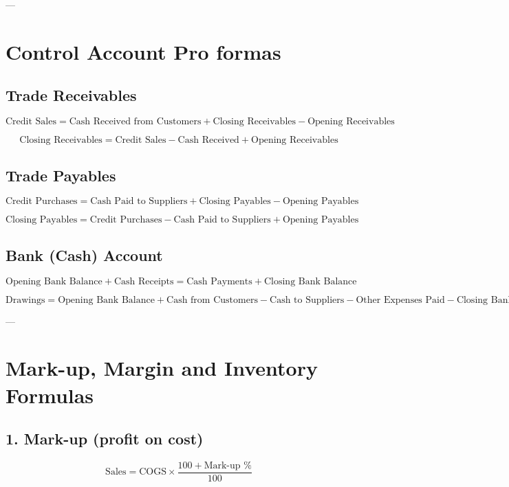 ---

\section{Control Account Pro formas}

\subsection{Trade Receivables}

\[
\text{Credit Sales} = \text{Cash Received from Customers} + \text{Closing Receivables} - \text{Opening Receivables}
\]

\[
\text{Closing Receivables} = \text{Credit Sales} - \text{Cash Received} + \text{Opening Receivables}
\]

\subsection{Trade Payables}

\[
\text{Credit Purchases} = \text{Cash Paid to Suppliers} + \text{Closing Payables} - \text{Opening Payables}
\]

\[
\text{Closing Payables} = \text{Credit Purchases} - \text{Cash Paid to Suppliers} + \text{Opening Payables}
\]

\subsection{Bank (Cash) Account}

\[
\text{Opening Bank Balance} + \text{Cash Receipts} = \text{Cash Payments} + \text{Closing Bank Balance}
\]

\[
\text{Drawings} = \text{Opening Bank Balance} + \text{Cash from Customers} - \text{Cash to Suppliers} - \text{Other Expenses Paid} - \text{Closing Bank Balance}
\]

---

\section{Mark-up, Margin and Inventory Formulas}

\subsection{1. Mark-up (profit on cost)}

\[
\text{Sales} = \text{COGS} \times \frac{100 + \text{Mark-up \%}}{100}
\]

